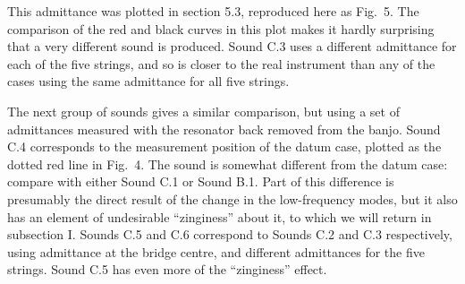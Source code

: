 


  This admittance was plotted in section 5.3, reproduced here as Fig.\ 5. The 
  comparison of the red and black curves in this plot makes it hardly 
  surprising that a very different sound is produced. Sound C.3 uses a 
  different admittance for each of the five strings, and so is closer to the 
  real instrument than any of the cases using the same admittance for all five 
  strings. 


  The next group of sounds gives a similar comparison, but using a set of 
  admittances measured with the resonator back removed from the banjo. Sound 
  C.4 corresponds to the measurement position of the datum case, plotted as the 
  dotted red line in Fig.\ 4. The sound is somewhat different from the datum 
  case: compare with either Sound C.1 or Sound B.1. Part of this difference is 
  presumably the direct result of the change in the low-frequency modes, but it 
  also has an element of undesirable ``zinginess'' about it, to which we will 
  return in subsection I. Sounds C.5 and C.6 correspond to Sounds C.2 and C.3 
  respectively, using admittance at the bridge centre, and different 
  admittances for the five strings. Sound C.5 has even more of the 
  ``zinginess'' effect. 



